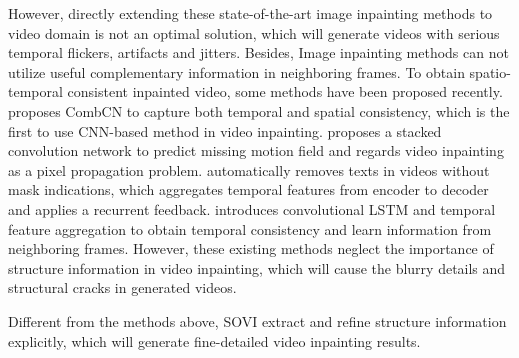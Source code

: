 However, directly extending these state-of-the-art image inpainting methods to video domain is not an optimal solution, which will generate videos with serious temporal flickers, artifacts and jitters. Besides, Image inpainting methods can not utilize useful complementary information in neighboring frames. To obtain spatio-temporal consistent inpainted video, some methods have been proposed recently.
\cite{wang2019video} proposes CombCN to capture both temporal and spatial consistency, which is the first to use CNN-based method in video inpainting. \cite{Xu_2019_CVPR} proposes a stacked convolution network to predict missing motion field and regards video inpainting as a pixel propagation problem. \cite{Kim_2019_CVPR} automatically removes texts in videos without mask indications, which aggregates temporal features from encoder to decoder and applies a recurrent feedback. \cite{Kim_2019_CVPR1} introduces convolutional LSTM and temporal feature aggregation to obtain temporal consistency and learn information from neighboring frames. However, these existing methods neglect the importance of structure information in video inpainting, which will cause the blurry details and structural cracks in generated videos. 

Different from the methods above, SOVI extract and refine structure information explicitly, which will generate fine-detailed video inpainting results.
































